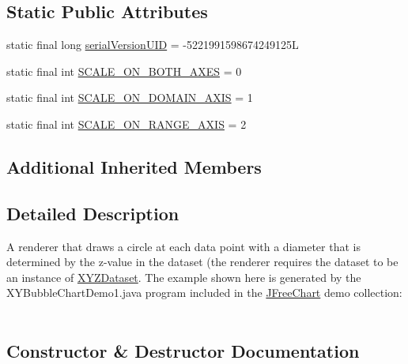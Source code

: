 \subsection*{Static Public Attributes}
\begin{DoxyCompactItemize}
\item 
static final long \mbox{\hyperlink{classorg_1_1jfree_1_1chart_1_1renderer_1_1xy_1_1_x_y_bubble_renderer_abbaaf95fc1d0a332a54b7d5a419cfb5f}{serial\+Version\+U\+ID}} = -\/5221991598674249125L
\item 
static final int \mbox{\hyperlink{classorg_1_1jfree_1_1chart_1_1renderer_1_1xy_1_1_x_y_bubble_renderer_a94cfe513a0749f72b57ef430f3590e7c}{S\+C\+A\+L\+E\+\_\+\+O\+N\+\_\+\+B\+O\+T\+H\+\_\+\+A\+X\+ES}} = 0
\item 
static final int \mbox{\hyperlink{classorg_1_1jfree_1_1chart_1_1renderer_1_1xy_1_1_x_y_bubble_renderer_a8be600dc688e3ecf53ce329739f4c39e}{S\+C\+A\+L\+E\+\_\+\+O\+N\+\_\+\+D\+O\+M\+A\+I\+N\+\_\+\+A\+X\+IS}} = 1
\item 
static final int \mbox{\hyperlink{classorg_1_1jfree_1_1chart_1_1renderer_1_1xy_1_1_x_y_bubble_renderer_a805e0d852a3e892741398e48df4ba9fb}{S\+C\+A\+L\+E\+\_\+\+O\+N\+\_\+\+R\+A\+N\+G\+E\+\_\+\+A\+X\+IS}} = 2
\end{DoxyCompactItemize}
\subsection*{Additional Inherited Members}


\subsection{Detailed Description}
A renderer that draws a circle at each data point with a diameter that is determined by the z-\/value in the dataset (the renderer requires the dataset to be an instance of \mbox{\hyperlink{}{X\+Y\+Z\+Dataset}}. The example shown here is generated by the {\ttfamily X\+Y\+Bubble\+Chart\+Demo1.\+java} program included in the \mbox{\hyperlink{classorg_1_1jfree_1_1chart_1_1_j_free_chart}{J\+Free\+Chart}} demo collection\+: ~\newline
~\newline
  

\subsection{Constructor \& Destructor Documentation}
\mbox{\label{classorg_1_1jfree_1_1chart_1_1renderer_1_1xy_1_1_x_y_bubble_renderer_a7d3c319c53a14ac3f188e4969e6dbddc}} 
